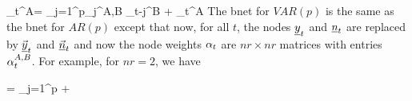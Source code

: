 \beq
\rvy_t^A=
\sum_{j=1}^p\alp_j^{A,B}
 \rvy_{t-j}^{B}
+ \rvn_t^A
\label{eq-var-def}
\eeq
The bnet for $VAR(p)$
is the same as the bnet
for  $AR(p)$
except that now,
for all $t$,
the nodes ${\underline{y}}_t$ 
and ${\underline{n}}_t$
are replaced by
$\vec{{\underline{y}}}_t$ 
and $\vec{{\underline{n}}}_t$
and now
the node weights $\alpha_t$
are $nr\times nr$
matrices
with entries $\alpha^{A,B}_t$.
For example, for $nr=2$, we have

{\renewcommand{\arraystretch}{1.5}
\beq
{}
=
\sum_{j=1}^p
+
\label{eq-var-2-def}
\eeq
}
